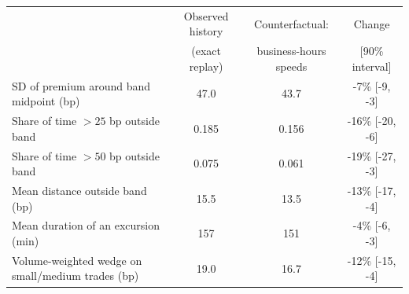 \begin{tabular}{lccc}
\toprule
 & Observed history & Counterfactual: & Change \\
 & (exact replay) & business-hours speeds & [90\% interval] \\
\midrule
SD of premium around band midpoint (bp) & 47.0 & 43.7 & -7\% [-9, -3] \\
Share of time $>25$ bp outside band & 0.185 & 0.156 & -16\% [-20, -6] \\
Share of time $>50$ bp outside band & 0.075 & 0.061 & -19\% [-27, -3] \\
Mean distance outside band (bp) & 15.5 & 13.5 & -13\% [-17, -4] \\
Mean duration of an excursion (min) & 157 & 151 & -4\% [-6, -3] \\
Volume-weighted wedge on small/medium trades (bp) & 19.0 & 16.7 & -12\% [-15, -4] \\
\bottomrule
\end{tabular}
